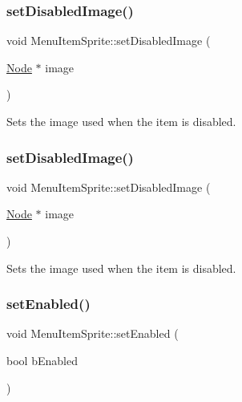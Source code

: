 \mbox{\label{classMenuItemSprite_ac93922466d23b5ae32c6da4ccb4bdd62}} 
\subsubsection{\texorpdfstring{set\+Disabled\+Image()}{setDisabledImage()}\hspace{0.1cm}{\footnotesize\ttfamily [1/2]}}
{\footnotesize\ttfamily void Menu\+Item\+Sprite\+::set\+Disabled\+Image (\begin{DoxyParamCaption}\item[{\hyperlink{classNode}{Node} $\ast$}]{image }\end{DoxyParamCaption})}

Sets the image used when the item is disabled. \mbox{\label{classMenuItemSprite_ac93922466d23b5ae32c6da4ccb4bdd62}} 
\subsubsection{\texorpdfstring{set\+Disabled\+Image()}{setDisabledImage()}\hspace{0.1cm}{\footnotesize\ttfamily [2/2]}}
{\footnotesize\ttfamily void Menu\+Item\+Sprite\+::set\+Disabled\+Image (\begin{DoxyParamCaption}\item[{\hyperlink{classNode}{Node} $\ast$}]{image }\end{DoxyParamCaption})}

Sets the image used when the item is disabled. \mbox{\label{classMenuItemSprite_a09946218901edb83c5ba363d1029b61d}} 
\subsubsection{\texorpdfstring{set\+Enabled()}{setEnabled()}\hspace{0.1cm}{\footnotesize\ttfamily [1/2]}}
{\footnotesize\ttfamily void Menu\+Item\+Sprite\+::set\+Enabled (\begin{DoxyParamCaption}\item[{bool}]{b\+Enabled }\end{DoxyParamCaption})\hspace{0.3cm}{\ttfamily [virtual]}}


